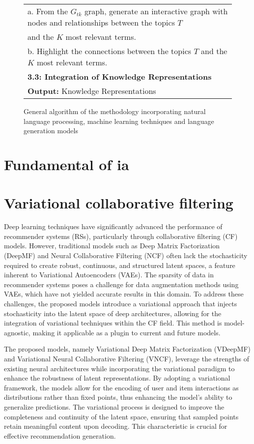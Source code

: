 \documentclass[runningheads]{llncs}
\begin{document}
\begin{figure*}[!h]
{\begin{tabular}{l}
			\quad \quad a. From the $G_{tk}$ graph, generate an interactive graph with nodes and relationships between the topics $T$\\
			\quad \quad and the $K$ most relevant terms.\\
			\quad \quad b. Highlight the connections between the topics $T$ and the $K$ most relevant terms.\\
			\quad \textbf{3.3: Integration of Knowledge Representations}\\
			\hline
			\textbf{Output:} Knowledge Representations \\
			\hline
		\end{tabular}
	}
	\caption{\centering General algorithm of the methodology incorporating natural language processing, machine learning techniques and language generation models}
	\label{tab:Algorithm}
\end{figure*}

\FloatBarrier

\section{Fundamental of ia}

\section{Variational collaborative filtering}
Deep learning techniques have significantly advanced the performance of recommender systems (RSs), particularly through collaborative filtering (CF) models. However, traditional models such as Deep Matrix Factorization (DeepMF) and Neural Collaborative Filtering (NCF) often lack the stochasticity required to create robust, continuous, and structured latent spaces, a feature inherent to Variational Autoencoders (VAEs). The sparsity of data in recommender systems poses a challenge for data augmentation methods using VAEs, which have not yielded accurate results in this domain. To address these challenges, the proposed models introduce a variational approach that injects stochasticity into the latent space of deep architectures, allowing for the integration of variational techniques within the CF field. This method is model-agnostic, making it applicable as a plugin to current and future models.

The proposed models, namely Variational Deep Matrix Factorization (VDeepMF) and Variational Neural Collaborative Filtering (VNCF), leverage the strengths of existing neural architectures while incorporating the variational paradigm to enhance the robustness of latent representations. By adopting a variational framework, the models allow for the encoding of user and item interactions as distributions rather than fixed points, thus enhancing the model's ability to generalize predictions. The variational process is designed to improve the completeness and continuity of the latent space, ensuring that sampled points retain meaningful content upon decoding. This characteristic is crucial for effective recommendation generation.
\end{document}
